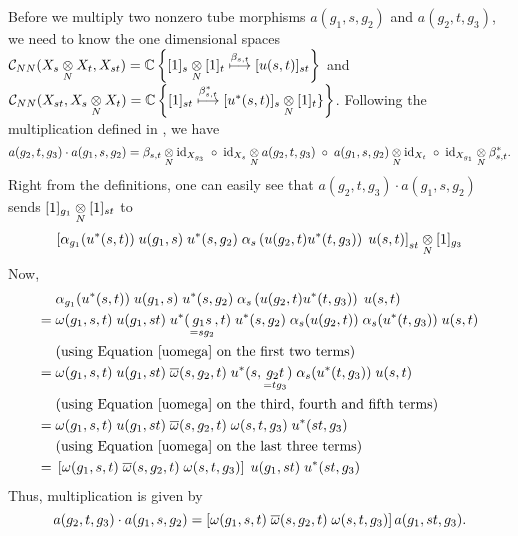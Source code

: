 Before we multiply two nonzero tube morphisms $ a(g_1 , s , g_2) $ and $ a(g_2, t , g_3) $, we need to know the one dimensional spaces $ \mathcal C_{NN} (X_s \underset{N}{\otimes} X_t , X_{st})  = \mathbb{C} \left\{[1]_s \underset{N}{\otimes} [1]_t \overset{\beta_{s,t}}{\longmapsto} [u(s,t) ]_{st}\right\}$ and $ \mathcal C_{NN} (X_{st} , X_s \underset{N}{\otimes} X_t) = \mathbb{C} \left\{ [1]_{st} \overset{\beta^*_{s,t}}{\longmapsto}  [u^* (s,t)]_s \underset{N}{\otimes} [1]_t \}\right\}$.
Following the multiplication defined in \cite[Section 3]{GJ}, we have
\[
a(g_2,t,g_3) \cdot a(g_1,s,g_2) = \beta_{s,t} \underset{N}{\otimes} \text{id}_{X_{g_3}} \; \circ \; \text{id}_{X_s} \underset{N}{\otimes} a(g_2 ,t , g_3) \; \circ \; a(g_1, s, g_2) \underset{N}{\otimes} \text{id}_{X_t} \; \circ \; \text{id}_{X_{g_1}} \underset{N}{\otimes} \beta^*_{s,t} .
\]
Right from the definitions, one can easily see that $ a(g_2,t,g_3) \cdot a(g_1,s,g_2) $ sends $ [1]_{g_1} \underset{N}{\otimes} [1]_{st} $ to
\[
\left[ \alpha_{g_1} (u^* (s,t)) \; u(g_1,s) \; u^* (s,g_2) \; \alpha_s \left( u(g_2, t) u^* (t,g_3) \right) \; u(s,t) \right]_{st} \underset{N}{\otimes} [1]_{g_3}
\]
Now,
\begin{align*}
&\; \alpha_{g_1} (u^* (s,t)) \; u(g_1,s) \; u^* (s,g_2) \; \alpha_s \left( u(g_2, t) u^* (t,g_3) \right) \; u(s,t)\\
= &\;  \omega (g_1,s,t) \; u(g_1,st) \; u^* (\underset{=s g_2}{g_1 s} ,t) \; u^* (s,g_2) \; \alpha_s ( u(g_2, t) )  \; \alpha_s ( u^* (t,g_3) ) \; u(s,t)\\
&\; \text{(using Equation \ref{uomega} on the first two terms)}\\
= &\;  \omega (g_1,s,t) \; u(g_1,st) \; \overline{\omega} (s , g_2 , t) \; u^* (s, \underset{= t g_3}{g_2 t})  \; \alpha_s ( u^* (t,g_3) ) \; u(s,t)\\
&\; \text{(using Equation \ref{uomega} on the third, fourth and fifth terms)}\\
= &\;  \omega (g_1,s,t) \; u(g_1,st) \; \overline{\omega} (s , g_2 , t)  \; \omega (s,t,g_3) \; u^*(st,g_3)\\
&\; \text{(using Equation \ref{uomega} on the last three terms)}\\
= &\; \left[\omega (g_1,s,t) \; \overline{\omega} (s , g_2 , t)  \; \omega (s,t,g_3)\right] \; u(g_1,st) \; u^*(st,g_3)
\end{align*}
Thus, multiplication is given by
\[
a(g_2,t,g_3) \cdot a(g_1,s,g_2) =  \left[\omega (g_1,s,t) \; \overline{\omega} (s , g_2 , t)  \; \omega (s,t,g_3)\right] a(g_1 , st , g_3).
\]

